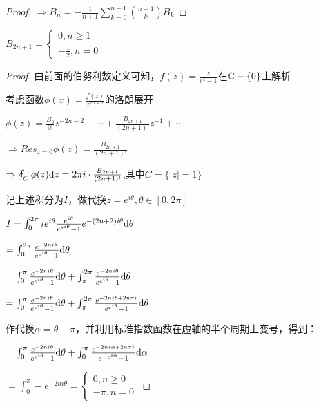 \documentclass[12pt, a4paper, oneside, UTF8]{ctexbook}
\begin{document}
\begin{para}{0}
\begin{proof}
					$\Rightarrow B_n=-\frac{1}{n+1}\sum\limits_{k=0}^{n-1}\binom{n+1}{k}B_{k}$
					
				\end{proof}
				\begin{para}{1}
					\begin{proposition}
						$B_{2n+1}=\begin{cases}
							0,n\geqslant 1 \\
							-\frac{1}{2},n=0 
						\end{cases}$
					\end{proposition}
					\begin{proof}
						由前面的伯努利数定义可知，$f(z)=\frac{z}{e^z-1}$在$\mathbb{C}-\{0\}$上解析
						
						考虑函数$\phi(x)=\frac{f(z)}{z^{2n+2}}$的洛朗展开
						
						$\phi(z)=\frac{B_0}{0!}z^{-2n-2}+\cdots+\frac{B_{2n+1}}{(2n+1)!}z^{-1}+\cdots$
						
						$\Rightarrow Res_{z=0}\phi(z)=\frac{B_{2n+1}}{(2n+1)!}$
						
						$\Rightarrow \oint_{C} \phi(z) \mathrm{d} z = 2\pi i\cdot \frac{B_{2n+1}}{(2n+1)!}$,其中$C=\{|z|=1\}$
						
						记上述积分为$I$，做代换$z=e^{i\theta},\theta\in[0,2\pi]$
						
						$I=\int_{0}^{2\pi} i e^{i\theta}\frac{e^{i\theta}}{e^{e^{i\theta}}-1}e^{-(2n+2)i\theta} \mathrm{d} \theta$
						
						$=\int_{0}^{2\pi} \frac{e^{-2ni\theta}}{e^{e^{i\theta}}-1}\mathrm{d}\theta$
						
						$=\int_{0}^{\pi} \frac{e^{-2ni\theta}}{e^{e^{i\theta}}-1}\mathrm{d}\theta+\int_{\pi}^{2\pi} \frac{e^{-2ni\theta}}{e^{e^{i\theta}}-1}\mathrm{d}\theta$
						
						$=\int_{0}^{\pi} \frac{e^{-2ni\theta}}{e^{e^{i\theta}}-1}\mathrm{d}\theta+\int_{\pi}^{2\pi} \frac{e^{-2ni\theta+2n\pi i}}{e^{e^{i\theta}}-1}\mathrm{d}\theta$
						
						作代换$\alpha = \theta-\pi$，并利用标准指数函数在虚轴的半个周期上变号，得到：
						
						$=\int_{0}^{\pi} \frac{e^{-2ni\theta}}{e^{e^{i\theta}}-1}\mathrm{d}\theta+\int_{0}^{\pi} \frac{e^{-2ni\alpha+2n\pi i}}{e^{-e^{i\alpha}}-1}\mathrm{d}\alpha$
						
						$=\int_{0}^{\pi} -e^{-2ni\theta}=\begin{cases}
							0,n \geqslant 0 \\
							-\pi,n=0
						\end{cases}$
						

\end{proof}
\end{para}
\end{para}
\end{document}
